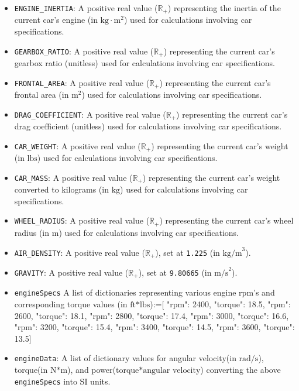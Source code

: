 \documentclass[12pt, titlepage]{article}
\begin{document}
\begin{itemize}
  \item \texttt{ENGINE\_INERTIA}: A positive real value ($\mathbb{R}_{+}$) representing the inertia of the current car's engine (in $\text{kg}\cdot\text{m}^2$) used for calculations involving car specifications.
  \item \texttt{GEARBOX\_RATIO}: A positive real value ($\mathbb{R}_{+}$) representing the current car's gearbox ratio (unitless) used for calculations involving car specifications.
  \item \texttt{FRONTAL\_AREA}: A positive real value ($\mathbb{R}_{+}$) representing the current car's frontal area (in $\text{m}^2$) used for calculations involving car specifications.
  \item \texttt{DRAG\_COEFFICIENT}: A positive real value ($\mathbb{R}_{+}$) representing the current car's drag coefficient (unitless) used for calculations involving car specifications.
  \item \texttt{CAR\_WEIGHT}: A positive real value ($\mathbb{R}_{+}$) representing the current car's weight (in $\text{lbs}$) used for calculations involving car specifications.
  \item \texttt{CAR\_MASS}: A positive real value ($\mathbb{R}_{+}$) representing the current car's weight converted to kilograms (in $\text{kg}$) used for calculations involving car specifications.
  \item \texttt{WHEEL\_RADIUS}: A positive real value ($\mathbb{R}_{+}$) representing the current car's wheel radius (in $\text{m}$) used for calculations involving car specifications.
  \item \texttt{AIR\_DENSITY}: A positive real value ($\mathbb{R}_{+}$), set at \texttt{1.225} (in $\text{kg/m}^3$).
  \item \texttt{GRAVITY}: A positive real value ($\mathbb{R}_{+}$), set at \texttt{9.80665} (in $\text{m/s}^2$).
  \item \texttt{engineSpecs} A list of dictionaries representing various engine rpm's and corresponding torque values (in $\text{ft*lbs}$):=[
    {"rpm": 2400, "torque": 18.5},
    {"rpm": 2600, "torque": 18.1},
    {"rpm": 2800, "torque": 17.4},
    {"rpm": 3000, "torque": 16.6},
    {"rpm": 3200, "torque": 15.4},
    {"rpm": 3400, "torque": 14.5},
    {"rpm": 3600, "torque": 13.5}]
  \item \texttt{engineData}: A list of dictionary values for angular velocity(in $\text{rad/s}$), torque(in $\text{N*m}$), and power($\text{torque*angular velocity}$) converting the above \texttt{engineSpecs} into SI units.

\end{itemize}
\end{document}
